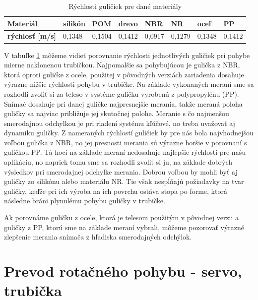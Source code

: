\begin{table}[ht]
	\centering
	\begin{tabular}{|l|l|l|l|l|l|l|l|}
		\hline
		\textbf{Materiál}           & silikón & POM    & drevo  & NBR                            & NR     & oceľ                           & PP                             \\ \hline
		\textbf{rýchlosť {[}m/s{]}} & 0,1348  &\cellcolor[HTML]{FFCCC9} 0,1504 & 0,1412 & \cellcolor[HTML]{9AFF99}0,0917 & 0,1279 & 0,1348 & \cellcolor[HTML]{FFFFFF}0,1412 \\ \hline
	\end{tabular}
    \caption{Rýchlosti guličiek pre dané materiály}
    \label{TABULKA_2_2}
\end{table}

V tabuľke \ref{TABULKA_2_2} môžeme vidieť porovnanie rýchlosti jednotlivých guličiek pri pohybe mierne naklonenou trubičkou. Najpomalšie sa pohybujúcou je gulička z NBR, ktorá oproti guličke z ocele, použitej v pôvodných verziách zariadenia dosahuje výrazne nižšie rýchlosti pohybu v trubičke.  
Na základe vykonaných meraní sme sa rozhodli zvoliť si za teleso v systéme guličku vyrobenú z polypropylénu (PP). Snímač dosahuje pri danej guličke najpresnejšie merania, takže meraná poloha guličky sa najviac približuje jej skutočnej polohe. Meranie s čo najmenšou smerodajnou odchylkou je pri riadení systému kľúčové, no treba uvažovať aj dynamiku guličky. Z nameraných rýchlostí guličiek by pre nás bola najvhodnejšou voľbou gulička z NBR, no jej presnosti merania sú výrazne horšie v porovnaní s guličkou PP. Tá hoci na základe meraní nedosahuje najlepšie rýchlosti pre našu aplikáciu, no napriek tomu sme sa rozhodli zvoliť si ju, na základe dobrých výsledkov pri smerodajnej odchylke merania. Dobrou voľbou by mohli byť aj guličky zo silikónu alebo materiálu NR. Tie však nespĺňajú požiadavky na tvar guličky, keďže pri ich výroba na ich povrchu ostáva stopa po forme, ktorá následne bráni plynulému pohybu guličky v trubičke.

Ak porovnáme guličku z ocele, ktorá je telesom použitým v pôvodnej verzii a guličky z PP, ktorú sme na základe meraní vybrali, môžeme pozorovať výrazné zlepšenie merania snímača z hľadiska smerodajných odchýlok.

\section{Prevod rotačného pohybu - servo, trubička}  
\label{kap:2.4}


